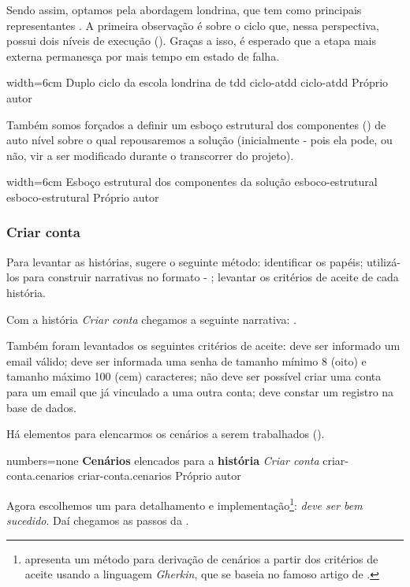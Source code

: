   Sendo assim, optamos pela abordagem londrina, que tem como principais representantes . A primeira observação é sobre o ciclo que, nessa perspectiva, possui dois níveis de execução (). Graças a isso, é esperado que a etapa mais externa permanesça por mais tempo em estado de falha.

  \imagem
    {width=6cm}
    {Duplo ciclo da escola londrina de tdd}
    {ciclo-atdd}
    {ciclo-atdd}
    {Próprio autor\footnotemark}

  Também somos forçados a definir um esboço estrutural dos componentes () de auto nível sobre o qual repousaremos a solução (inicialmente - pois ela pode, ou não, vir a ser modificado durante o transcorrer do projeto).

  \imagem
    {width=6cm}
    {Esboço estrutural dos componentes da solução}
    {esboco-estrutural}
    {esboco-estrutural}
    {Próprio autor}

  \subsubsection{Criar conta}

    Para levantar as histórias,  sugere o seguinte método: identificar os papéis; utilizá-los para construir narrativas no formato - ; levantar os critérios de aceite de cada história.

    Com a história \emph{Criar conta} chegamos a seguinte narrativa: .

    Também foram levantados os seguintes critérios de aceite: deve ser informado um email válido; deve ser informada uma senha de tamanho mínimo 8 (oito) e tamanho máximo 100 (cem) caracteres; não deve ser possível criar uma conta para um email que já vinculado a uma outra conta; deve constar um registro na base de dados.

    Há elementos para elencarmos os cenários a serem trabalhados ().

    \codigo
      {numbers=none}
      {\textbf{Cenários} elencados para a \textbf{história} \emph{Criar conta}}
      {criar-conta.cenarios}
      {criar-conta.cenarios}
      {Próprio autor}

    Agora escolhemos um para detalhamento e implementação\footnote{ apresenta um método para derivação de cenários a partir dos critérios de aceite usando a linguagem \emph{Gherkin}, que se baseia no famoso artigo de .}: \emph{deve ser bem sucedido}. Daí chegamos as passos da .

